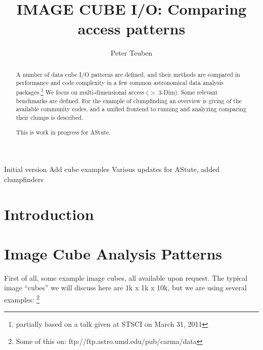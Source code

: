 \documentclass[preprint]{aastex} %
\begin{document}

\title{IMAGE CUBE I/O: Comparing access patterns}

\author{Peter Teuben}

\begin{abstract}

A number of data cube I/O patterns are defined, and
their methods are compared in performance
and code complexity in a few common astronomical
data analysis packages.\footnote{partially based on a talk
given at STSCI on March 31, 2011} 
We focus on multi-dimensional access ($>$ 3-Dim). 
Some relevant benchmarks are defined. 
For the example of clumpfinding an overview is giving
of the available community codes, and a unified frontend
to running and analyzing comparing their clumps is 
described.

This is work in progress for AStute.
\end{abstract}


\ChangeRecordBegin
{}
{Initial version }
{Add cube examples }
{Various updates for AStute, added clumpfinders}
\ChangeRecordEnd


\section{Introduction}

\section{Image Cube Analysis Patterns}


First of all, some 
example image cubes, all available upon request.
The typical image ``cubes'' we will discuss here are 1k x 1k x 10k, but we 
are using several examples:
\footnote{Some of this on: ftp://ftp.astro.umd.edu/pub/carma/data}
\end{document}
